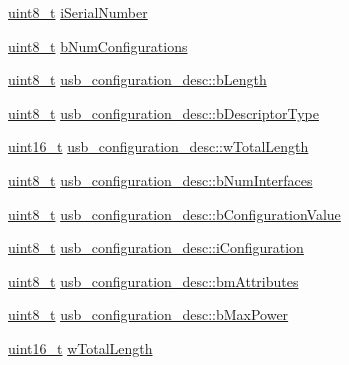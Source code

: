 \begin{DoxyCompactItemize}
\hyperlink{stdint_8h_aba7bc1797add20fe3efdf37ced1182c5}{uint8\-\_\-t} \hyperlink{group___p_i_o_s___u_s_b___d_e_f_s_gaeb129fc0d41494f69369da70d73eac11}{i\-Serial\-Number}
\item 
\hyperlink{stdint_8h_aba7bc1797add20fe3efdf37ced1182c5}{uint8\-\_\-t} \hyperlink{group___p_i_o_s___u_s_b___d_e_f_s_gabde4f60e84b2d9b10c27aa23bae62595}{b\-Num\-Configurations}
\item 
\hyperlink{stdint_8h_aba7bc1797add20fe3efdf37ced1182c5}{uint8\-\_\-t} \hyperlink{group___p_i_o_s___u_s_b___d_e_f_s_ga37130504779d534ee26038329c6cf556}{usb\-\_\-configuration\-\_\-desc\-::b\-Length}
\item 
\hyperlink{stdint_8h_aba7bc1797add20fe3efdf37ced1182c5}{uint8\-\_\-t} \hyperlink{group___p_i_o_s___u_s_b___d_e_f_s_gaa3581ef511398a39f3dba3517e45207b}{usb\-\_\-configuration\-\_\-desc\-::b\-Descriptor\-Type}
\item 
\hyperlink{stdint_8h_a273cf69d639a59973b6019625df33e30}{uint16\-\_\-t} \hyperlink{group___p_i_o_s___u_s_b___d_e_f_s_ga5d8ee63135423fa6ee5de728aa2c4ffd}{usb\-\_\-configuration\-\_\-desc\-::w\-Total\-Length}
\item 
\hyperlink{stdint_8h_aba7bc1797add20fe3efdf37ced1182c5}{uint8\-\_\-t} \hyperlink{group___p_i_o_s___u_s_b___d_e_f_s_ga12405f84f025bf39bd4261c0ec16b709}{usb\-\_\-configuration\-\_\-desc\-::b\-Num\-Interfaces}
\item 
\hyperlink{stdint_8h_aba7bc1797add20fe3efdf37ced1182c5}{uint8\-\_\-t} \hyperlink{group___p_i_o_s___u_s_b___d_e_f_s_ga3a0621b62628b16a9f6bb18aace6a2bb}{usb\-\_\-configuration\-\_\-desc\-::b\-Configuration\-Value}
\item 
\hyperlink{stdint_8h_aba7bc1797add20fe3efdf37ced1182c5}{uint8\-\_\-t} \hyperlink{group___p_i_o_s___u_s_b___d_e_f_s_ga2cc988492163e6ca3d548cf632fbf01d}{usb\-\_\-configuration\-\_\-desc\-::i\-Configuration}
\item 
\hyperlink{stdint_8h_aba7bc1797add20fe3efdf37ced1182c5}{uint8\-\_\-t} \hyperlink{group___p_i_o_s___u_s_b___d_e_f_s_ga76649c01c303d92feff0e4c3767d02ac}{usb\-\_\-configuration\-\_\-desc\-::bm\-Attributes}
\item 
\hyperlink{stdint_8h_aba7bc1797add20fe3efdf37ced1182c5}{uint8\-\_\-t} \hyperlink{group___p_i_o_s___u_s_b___d_e_f_s_gaf57a5d3898006764248c6c40130c3d90}{usb\-\_\-configuration\-\_\-desc\-::b\-Max\-Power}
\item 
\hyperlink{stdint_8h_a273cf69d639a59973b6019625df33e30}{uint16\-\_\-t} \hyperlink{group___p_i_o_s___u_s_b___d_e_f_s_ga866c5d9bb8a60f25805d37b7a5b5f9e8}{w\-Total\-Length}

\end{DoxyCompactItemize}
